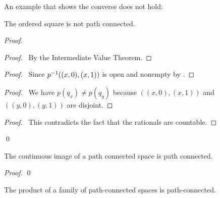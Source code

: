 An example that shows the converse does not hold:
\begin{example}
    The ordered square is not path connected.

    \begin{proof}
        \pf
        \begin{proof}
            \pf\ By the Intermediate Value Theorem.
        \end{proof}
        \begin{proof}
            \pf\ Since ${p}^{-1}((x,0),(x,1))$ is open and nonempty by .
        \end{proof}
        \begin{proof}
            \pf\ We have $p(q_x) \neq p(q_y)$ because $((x,0),(x,1))$ and $((y,0),(y,1))$ are disjoint.
        \end{proof}
        \qedstep
        \begin{proof}
            \pf\ This contradicts the fact that the rationals are countable.
        \end{proof}
        \qed
    \end{proof}
\end{example}

\begin{proposition}
    \label{proposition:path_connected_continuous_image}
    The continuous image of a path connected space is path connected.
\end{proposition}

\begin{proof}
    \pf
    \qed
\end{proof}

\begin{proposition}[AC]
    The product of a family of path-connected spaces is path-connected.
\end{proposition}

